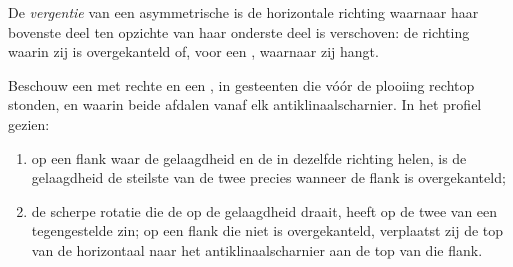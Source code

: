 \begin{definition}[Vergentie]\label{def:b1:faults-folds-fabrics:vergence}
De \emph{vergentie} van een asymmetrische  is de horizontale richting waarnaar haar bovenste deel ten opzichte van haar onderste deel is verschoven: de richting waarin zij is overgekanteld of, voor een , waarnaar zij hangt.
\end{definition}

\begin{proposition}\label{prop:b1:faults-folds-fabrics:cleavage-bedding}
Beschouw een  met rechte  en een , in gesteenten die vóór de plooiing rechtop stonden, en waarin beide  afdalen vanaf elk antiklinaalscharnier. In het profiel gezien:
\begin{enumerate}[label=(\alph*)]
  \item op een flank waar de gelaagdheid en de  in dezelfde richting helen, is de gelaagdheid de steilste van de twee precies wanneer de flank is overgekanteld;
  \item de scherpe rotatie die de  op de gelaagdheid draait, heeft op de twee  van een  tegengestelde zin; op een flank die niet is overgekanteld, verplaatst zij de top van de  horizontaal naar het antiklinaalscharnier aan de top van die flank.
\end{enumerate}
\end{proposition}

